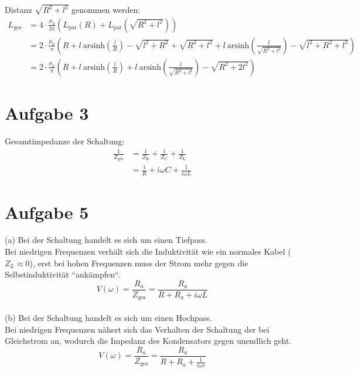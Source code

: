 \documentclass[11pt a4paper]{article}
\newcommand{\arsinh}{\text{arsinh}}
\begin{document}
Distanz $\sqrt{R^2 + l^2}$ genommen werden:
\begin{align*}
	L_\text{ges} 
	&= 4 \cdot \frac{\mu_0}{2\pi}
		\left( L_\text{par} (R) + L_\text{par} \left( \sqrt{R^2 + l^2} \right) \right) \\
	&= 2 \cdot \frac{\mu_0}{\pi} \left( 
			R + l \ \arsinh \left(\frac{l}{R} \right) - \sqrt{l^2 + R^2} + 
			\sqrt{R^2 + l^2} + l \ \arsinh \left(\frac{l}{\sqrt{R^2 + l^2}} \right) 
			- \sqrt{l^2 + R^2 + l^2}
		\right) \\
	&= 2 \cdot \frac{\mu_0}{\pi} \left( 
			R + l \ \arsinh \left(\frac{l}{R} \right)
			  + l \ \arsinh \left(\frac{l}{\sqrt{R^2 + l^2}} \right) 
			- \sqrt{R^2 + 2l^2}
		\right)
\end{align*}



\newpage

\section*{Aufgabe 3}

Gesamtimpedanze der Schaltung:
\begin{align*}
	\frac1{Z_\text{ges}}
	&= \frac1{Z_\text{R}} + \frac1{Z_\text{C}} + \frac1{Z_\text{L}} \\
	&= \frac1R + i\omega C + \frac1{i\omega L}
\end{align*}

\newpage

\section*{Aufgabe 5}

\quad (a) Bei der Schaltung handelt es sich um einen Tiefpass. \\
Bei niedrigen Frequenzen verhält sich die Induktivität 
wie ein normales Kabel ($Z_L \approx 0$), erst bei hohen Frequenzen muss der Strom mehr gegen die 
Selbstinduktivität ``ankämpfen``.
\[ V(\omega) = \frac{R_a}{Z_\text{ges}} = \frac{R_a}{R + R_a + i\omega L} \]
\\

(b) Bei der Schaltung handelt es sich um einen Hochpass. \\
Bei niedrigen Frequenzen nähert sich das Verhalten der
Schaltung der bei Gleichstrom an, wodurch die Impedanz des Kondensators gegen unendlich geht.
\[ V(\omega) = \frac{R_a}{Z_\text{ges}} = \frac{R_a}{R + R_a + \frac{1}{i\omega c}} \]
\\
\end{document}
